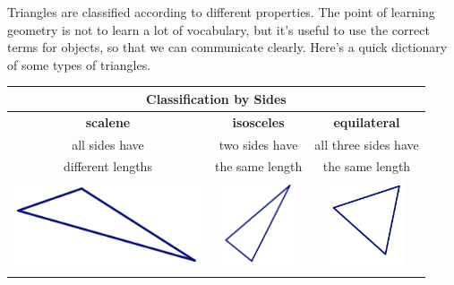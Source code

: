 \newpage

Triangles are classified according to different properties.  The point of learning geometry is not to learn a lot of vocabulary, but it's useful to use the correct terms for objects, so that we can communicate clearly.  Here's a quick dictionary of some types of triangles.

\bigskip
\bigskip

\begin{center}


\begin{tabular}{c|c|c}\hline
\multicolumn{3}{c}{\bf Classification by Sides}\\
\hline\hline
{\bf scalene} & {\bf isosceles} & {\bf equilateral }  \\
\hline
all sides have  & two sides have  & all three sides have \\
different lengths & the same length & the same length\\
\hline
\includegraphics[height=2.5cm]{scalene} & 
\includegraphics[height=2.5cm]{isos} &
\includegraphics[height=2.5cm]{equilat}  \\
\hline\label{def:trisides}
\end{tabular}


\bigskip
\bigskip
\bigskip



\end{center}
